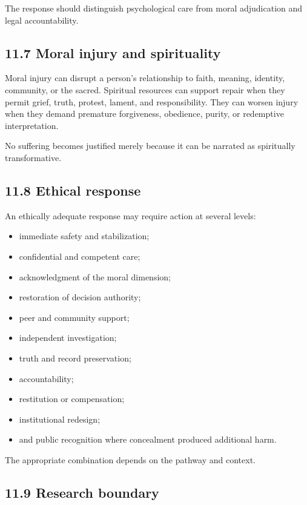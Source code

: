\documentclass[
  11pt,
]{article}
\providecommand{\tightlist}{%
  \setlength{\itemsep}{0pt}\setlength{\parskip}{0pt}}
\begin{document}
The response should distinguish psychological care from moral
adjudication and legal accountability.

\subsection{11.7 Moral injury and
spirituality}\label{moral-injury-and-spirituality}

Moral injury can disrupt a person's relationship to faith, meaning,
identity, community, or the sacred. Spiritual resources can support
repair when they permit grief, truth, protest, lament, and
responsibility. They can worsen injury when they demand premature
forgiveness, obedience, purity, or redemptive interpretation.

No suffering becomes justified merely because it can be narrated as
spiritually transformative.

\subsection{11.8 Ethical response}\label{ethical-response}

An ethically adequate response may require action at several levels:

\begin{itemize}
\tightlist
\item
  immediate safety and stabilization;
\item
  confidential and competent care;
\item
  acknowledgment of the moral dimension;
\item
  restoration of decision authority;
\item
  peer and community support;
\item
  independent investigation;
\item
  truth and record preservation;
\item
  accountability;
\item
  restitution or compensation;
\item
  institutional redesign;
\item
  and public recognition where concealment produced additional harm.
\end{itemize}

The appropriate combination depends on the pathway and context.

\subsection{11.9 Research boundary}\label{research-boundary}
\end{document}
